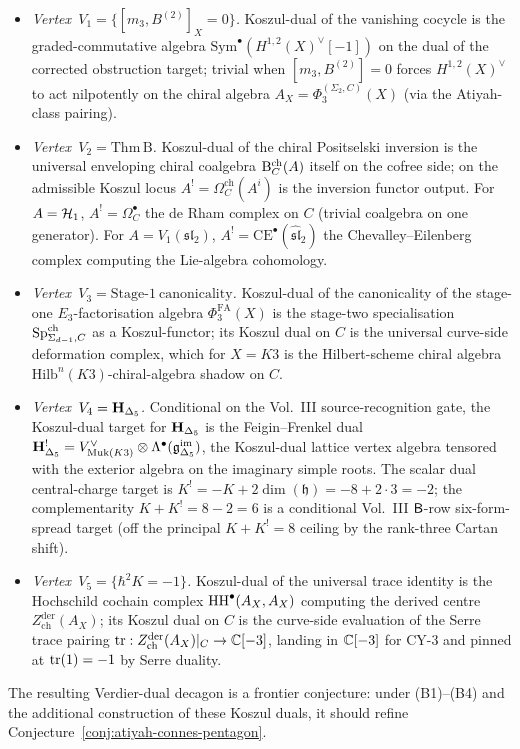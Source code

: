 \begin{itemize}
\item \emph{Vertex~$V_1 = \{[m_3, B^{(2)}]_X = 0\}$.} Koszul-dual of the
vanishing cocycle is the graded-commutative algebra
$\mathrm{Sym}^\bullet(H^{1,2}(X)^\vee[-1])$ on the dual of the
corrected obstruction target; trivial when $[m_3, B^{(2)}] = 0$ forces
$H^{1,2}(X)^\vee$ to act nilpotently on the chiral algebra
$A_X = \Phi_3^{(\Sigma_2,C)}(X)$ (via the Atiyah-class pairing).

\item \emph{Vertex~$V_2 = \mathrm{Thm\,B}$.} Koszul-dual of the chiral
Positselski inversion is the universal enveloping chiral coalgebra
$\Bar^{\mathrm{ch}}_C(A)$ itself on the cofree side; on the admissible
Koszul locus $A^! = \Omega^{\mathrm{ch}}_C(A^i)$ is the inversion
functor output. For $A = \cH_1$, $A^! = \Omega_C^\bullet$ the de Rham
complex on $C$ (trivial coalgebra on one generator). For
$A = V_1(\mathfrak{sl}_2)$, $A^! = \mathrm{CE}^\bullet(\hat{\mathfrak{sl}}_2)$
the Chevalley--Eilenberg complex computing the Lie-algebra cohomology.

\item \emph{Vertex~$V_3 = \mathrm{Stage\text{-}1\ canonicality}$.}
Koszul-dual of the canonicality of the stage-one
$E_3$-factorisation algebra $\Phi^{\mathrm{FA}}_3(X)$ is the stage-two
specialisation $\Sp^{\mathrm{ch}}_{\Sigma_{d-1}, C}$ as a
Koszul-functor; its Koszul dual on $C$ is the universal curve-side
deformation complex, which for $X = K3$ is the Hilbert-scheme chiral
algebra $\mathrm{Hilb}^n(K3)$-chiral-algebra shadow on $C$.

\item \emph{Vertex~$V_4 = \bfH_{\Delta_5}$.} Conditional on the
Vol.~III source-recognition gate, the Koszul-dual target for
$\bfH_{\Delta_5}$ is the Feigin--Frenkel dual
$\bfH_{\Delta_5}^! = V_{\mathrm{Muk}(K3)}^\vee \otimes \Lambda^\bullet(\mathfrak g^{\mathrm{im}}_{\Delta_5})$,
the Koszul-dual lattice vertex algebra tensored with the exterior
algebra on the imaginary simple roots. The scalar dual central-charge
target is
$K^! = -K + 2\dim(\mathfrak h) = -8 + 2\cdot 3 = -2$; the
complementarity $K + K^! = 8 - 2 = 6$ is a conditional Vol.~III
$\sfB$-row six-form-spread target (off the principal $K + K^! = 8$
ceiling by the rank-three Cartan shift).

\item \emph{Vertex~$V_5 = \{\hbar^2 K = -1\}$.} Koszul-dual of the
universal trace identity is the Hochschild cochain complex
$\HH^\bullet(A_X, A_X)$ computing the derived centre
$Z^{\mathrm{der}}_{\mathrm{ch}}(A_X)$; its Koszul dual on $C$ is the
curve-side evaluation of the Serre trace pairing
$\tr : Z^{\mathrm{der}}_{\mathrm{ch}}(A_X)|_C \to \Cbb[-3]$, landing
in $\Cbb[-3]$ for CY-3 and pinned at $\tr(1) = -1$ by Serre duality.
\end{itemize}

The resulting Verdier-dual decagon is a frontier conjecture: under
\textup{(B1)--(B4)} and the additional construction of these Koszul
duals, it should refine Conjecture~\ref{conj:atiyah-connes-pentagon}.

